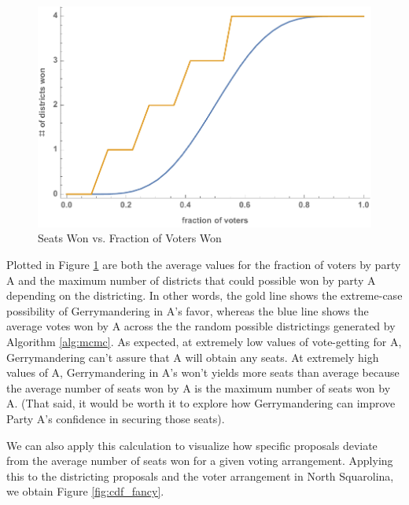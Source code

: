 \documentclass[12pt]{article}
\begin{document}
    \begin{figure}[h!]
    \centering
    \includegraphics[scale=0.7]{b.pdf}
    \caption{Seats Won vs. Fraction of Voters Won}
    \label{fig:cdf}
    \end{figure}
\par
Plotted in Figure \ref{fig:cdf} are both the average values for the fraction of voters by party A and the maximum number of districts that could possible won by party A depending on the districting. In other words, the gold line shows the extreme-case possibility of Gerrymandering in A's favor, whereas the blue line shows the average votes won by A across the the random possible districtings generated by Algorithm \ref{alg:mcmc}. As expected, at extremely low values of vote-getting for A, Gerrymandering can't assure that A will obtain any seats. At extremely high values of A, Gerrymandering in A's won't yields more seats than average because the average number of seats won by A is the maximum number of seats won by A. (That said, it would be worth it to explore how Gerrymandering can improve Party A's confidence in securing those seats). 
\par
We can also apply this calculation to visualize how specific proposals deviate from the average number of seats won for a given voting arrangement. Applying this to the districting proposals and the voter arrangement in North Squarolina, we obtain Figure \ref{fig:cdf_fancy}.
\end{document}
